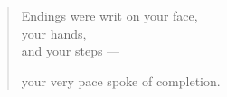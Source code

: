 \documentclass[11pt,onesided]{memoir}
\begin{document}
    \null
    \thispagestyle{empty}
    \cleardoublepage

  \null
  \vfill
  \begin{verse}
    Endings were writ on your face,\\
    \vin your hands,\\
    \vin \vin and your steps ---

    your very pace spoke of completion.
  \end{verse}
  \vfill
  \newpage
  \null
  \thispagestyle{empty}
    \cleardoublepage

  \backmatter
  \pagestyle{empty}
  
\end{document}
